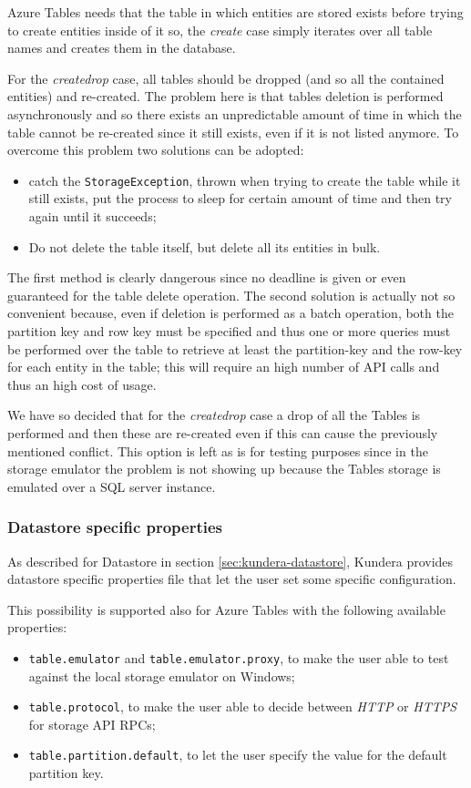 \noindent Azure Tables needs that the table in which entities are stored exists before trying to create entities inside of it so, the \textit{create} case simply iterates over all table names and creates them in the database. 

\noindent For the \textit{create\textunderscore drop} case, all tables should be dropped (and so all the contained entities) and re-created. The problem here is that tables deletion is performed asynchronously and so there exists an unpredictable amount of time in which the table cannot be re-created since it still exists, even if it is not listed anymore.
\noindent To overcome this problem two solutions can be adopted:
\begin{itemize}
\item catch the \texttt{StorageException}, thrown when trying to create the table while it still exists, put the process to sleep for certain amount of time and then try again until it succeeds;
\item Do not delete the table itself, but delete all its entities in bulk.
\end{itemize}

\noindent The first method is clearly dangerous since no deadline is given or even guaranteed for the table delete operation. The second solution is actually not so convenient because, even if deletion is performed as a batch operation, both the partition key and row key must be specified and thus one or more queries must be performed over the table to retrieve at least the partition-key and the row-key for each entity in the table; this will require an high number of API calls and thus an high cost of usage.

\noindent We have so decided that for the \textit{create\textunderscore drop} case a drop of all the Tables is performed and then these are re-created even if this can cause the previously mentioned conflict. This option is left as is for testing purposes since in the storage emulator the problem is not showing up because the Tables storage is emulated over a SQL server instance.

\subsubsection{Datastore specific properties}
As described for Datastore in section \ref{sec:kundera-datastore}, Kundera provides datastore specific properties file that let the user set some specific configuration.

\noindent This possibility is supported also for Azure Tables with the following available properties:
\begin{itemize}
\item \texttt{table.emulator} and \texttt{table.emulator.proxy}, to make the user able to test against the local storage emulator on Windows;
\item \texttt{table.protocol}, to make the user able to decide between \textit{HTTP} or \textit{HTTPS} for storage API RPCs;
\item \texttt{table.partition.default}, to let the user specify the value for the default partition key.
\end{itemize} 


